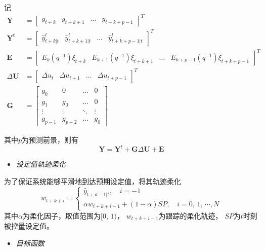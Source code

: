 记
\begin{align*}
\bm{Y} &= \left[\begin{array}{cccc} y_{t+k} & y_{t+k+1} & \ldots & y_{t+k+p-1} \end{array}\right]^{T} \\
\bm{Y^{t}} &= \left[\begin{array}{cccc} \hat{y}^{t}_{t+k|t} & \hat{y}^{t}_{t+k+1|t} & \ldots & \hat{y}^{t}_{t+k+p-1|t} \end{array}\right]^{T} \\
\bm{E} &= \left[\begin{array}{cccc} E_{k}(q^{-1}){\xi_{t+k}} & E_{k+1}(q^{-1}){\xi_{t+k+1}} & \ldots & E_{k+p-1}(q^{-1}){\xi_{t+k+p-1}} \end{array}\right]^{T} \\
{\Delta}{\bm{U}} &= \left[\begin{array}{cccc} {\Delta}{u_{t}} & \Delta{u_{t+1}} & \ldots & \Delta{u_{t+p-1}} \end{array}\right]^{T} \\
\bm{G} &= \left[{\begin{array}{cccc}
g_{0} & 0 & \ldots & 0 \\
g_{1} & g_{0} & \ldots & 0\\
\vdots & \vdots & \ddots & \vdots\\
g_{p-1} & g_{p-2} &\ldots & g_{0}
\end{array}}\right]
\end{align*}

其中$p$为预测前景，则有
\begin{equation}
\bm{Y} = \bm{Y}^{t} +\bm{G}{\Delta}{\bm{U}}+\bm{E}
\end{equation}

\begin{itemize}
\item{\emph{设定值轨迹柔化}}
\end{itemize}

为了保证系统能够平滑地到达预期设定值，将其轨迹柔化
\begin{equation}
w_{t+k+i} = \begin{cases}
\hat{y}_{t+d-1|t},\quad i = -1 \\
\alpha{w_{t+k+i-1}}+(1-\alpha)SP, \quad i = 0,\,1,\,\cdots,N
\end{cases}
\end{equation}
其中$\alpha$为柔化因子，取值范围为$[0,\,1)$， $w_{t+k+i-1}$为跟踪的柔化轨迹， $SP$为$t$时刻被控量设定值。

\begin{itemize}
\item{\emph{目标函数}}
\end{itemize}

